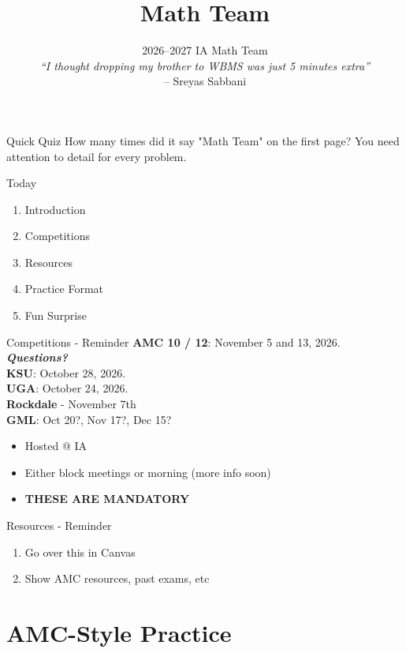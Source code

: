 \documentclass[aspectratio=169,xcolor=dvipsnames]{beamer}
\title[Math Team]{Math Team}
\subtitle{2026--2027 IA Math Team\\[0.8em]\textit{``I thought dropping my brother to WBMS was just 5 minutes extra''}\\[-0.2em]{\scriptsize -- Sreyas Sabbani}}
\begin{document}
\begin{frame}[t]
  \titlepage
\end{frame}
\begin{frame}{Quick Quiz}
    How many times did it say "Math Team" on the first page? You need attention to detail for every problem.
\end{frame}

\begin{frame}[t]{Today}
\vspace{0.35cm}
\begin{enumerate}
    \item Introduction
    \item Competitions
    \item Resources
    \item Practice Format
    \item Fun Surprise
\end{enumerate}
\end{frame}

\begin{frame}[t]{Competitions - Reminder}
\vspace{0.35cm}
\textbf{AMC 10 / 12}: November 5 and 13, 2026. \textbf{\textit{Questions?}} \\
\textbf{KSU}: October 28, 2026. \\
\textbf{UGA}: October 24, 2026. \\
\textbf{Rockdale} - November 7th \\
\textbf{GML}: Oct 20?, Nov 17?, Dec 15?\\
\begin{itemize}
    \small \item Hosted @ IA
    \item Either block meetings or morning (more info soon)
    \item \textbf{THESE ARE MANDATORY}
\end{itemize}
\end{frame}

\begin{frame}[t]{Resources - Reminder}
\begin{enumerate}
    \item Go over this in Canvas
    \item Show AMC resources, past exams, etc
\end{enumerate}
\end{frame}

\section{AMC-Style Practice}
\end{document}
